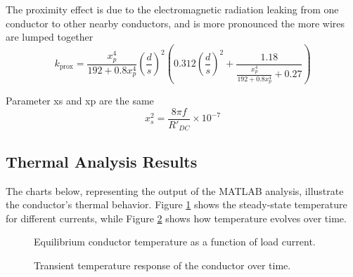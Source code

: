 \documentclass[12pt, a4paper]{article}
\begin{document}
	The proximity effect is due to the electromagnetic radiation leaking from one conductor to other nearby conductors, and is more pronounced the more wires are lumped together
\begin{equation}
k_{\text{prox}} = \frac{x_p^4}{192 + 0.8 x_p^4} \left(\frac{d}{s}\right)^2 \left( 0.312\left(\frac{d}{s}\right)^2 + \frac{1.18}{\frac{x_p^4}{192 + 0.8 x_p^4} + 0.27} \right)
\end{equation}

Parameter xs and xp are the same
\begin{equation}
x_s^2 = \frac{8 \pi f}{R'_{DC}} \times 10^{-7}
\end{equation} 

\subsection{Thermal Analysis Results}
The charts below, representing the output of the MATLAB analysis, illustrate the conductor's thermal behavior. Figure \ref{fig:heating_curve} shows the steady-state temperature for different currents, while Figure \ref{fig:transient_heating} shows how temperature evolves over time.

\begin{figure}[h!]
    \centering
    \caption{Equilibrium conductor temperature as a function of load current.}
    \label{fig:heating_curve}
\end{figure}

\begin{figure}[h!]
    \centering
    \caption{Transient temperature response of the conductor over time.}
    \label{fig:transient_heating}
\end{figure}
\end{document}
